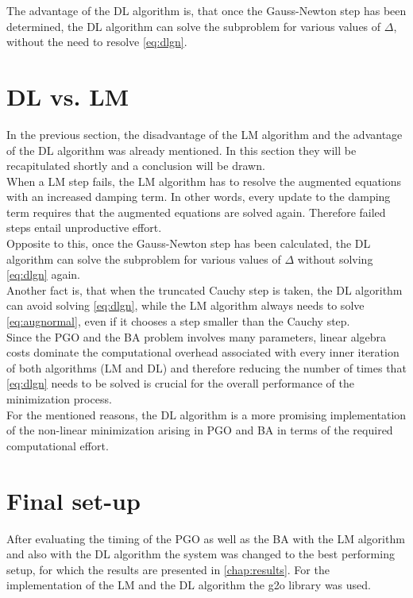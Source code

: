 The advantage of the \ac{DL} algorithm is, that once the Gauss-Newton step has been determined, the \ac{DL} algorithm can solve the subproblem for various values of $\Delta$, without the need to resolve \autoref{eq:dlgn}.

\section{\ac{DL} vs. \ac{LM}}
In the previous section, the disadvantage of the \ac{LM} algorithm and the advantage of the \ac{DL} algorithm was already mentioned. In this section they will be recapitulated shortly and a conclusion will be drawn.\\

When a \ac{LM} step fails, the \ac{LM} algorithm has to resolve the augmented equations with an increased damping term. In other words, every update to the damping term requires that the augmented equations are solved again. Therefore failed steps entail unproductive effort.\\
Opposite to this, once the Gauss-Newton step has been calculated, the \ac{DL} algorithm can solve the subproblem for various values of $\Delta$ without solving \autoref{eq:dlgn} again.\\
Another fact is, that when the truncated Cauchy step is taken, the \ac{DL} algorithm can avoid solving \autoref{eq:dlgn}, while the \ac{LM} algorithm always needs to solve \autoref{eq:augnormal}, even if it chooses a step smaller than the Cauchy step.\\

Since the \ac{PGO} and the \ac{BA} problem involves many parameters, linear algebra costs dominate the computational overhead associated with every inner iteration of both algorithms (\ac{LM} and \ac{DL}) and therefore reducing the number of times that \autoref{eq:dlgn} needs to be solved is crucial for the overall performance of the minimization process.\\
For the mentioned reasons, the \ac{DL} algorithm is a more promising implementation of the non-linear minimization arising in \ac{PGO} and \ac{BA} in terms of the required computational effort.

\section{Final set-up}
After evaluating the timing of the \ac{PGO} as well as the \ac{BA} with the \ac{LM} algorithm and also with the \ac{DL} algorithm the system was changed to the best performing setup, for which the results are presented in \autoref{chap:results}. For the implementation of the \ac{LM} and the \ac{DL} algorithm the g2o library \cite{Kummerle2011} was used.  
